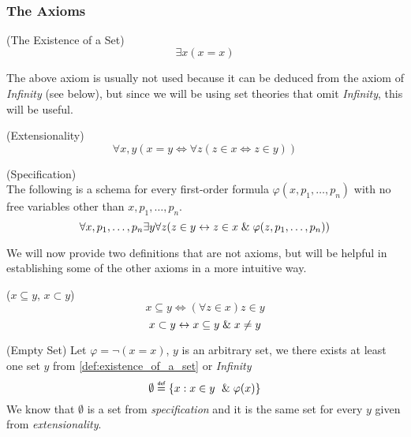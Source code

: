 \


\subsubsection{The Axioms}

\begin{definition}{(The Existence of a Set)}\label{def:existence_of_a_set}
\begin{equation}
\exists x (x = x)
\end{equation}
\end{definition}
The above axiom is usually not used because it can be deduced from the axiom of \emph{Infinity} (see below), but since we will be using set theories that omit \emph{Infinity}, this will be useful.

\begin{definition}{(Extensionality)}\label{def:extensionality}
\begin{equation}
\forall x, y (x = y \iff \forall z (z \in x \iff z \in y)) %
\end{equation}
\end{definition}

\begin{definition}{(Specification)}\label{def:specification}\\
The following is a schema for every first-order formula $\varphi(x, p_1, \ldots, p_n)$ with no free variables other than $x, p_1, \ldots, p_n$.
\begin{equation}
\forall x, p_1, \ldots, p_n \exists y \forall z ( z \in y \iff z \in x \et \varphi(z, p_1, \ldots, p_n)) %
\end{equation}
\end{definition}

We will now provide two definitions that are not axioms, but will be helpful in establishing some of the other axioms in a more intuitive way.
\begin{definition}{($x \subseteq y$, $x \subset y$)}\label{def:subset}
\begin{equation}
x \subseteq y \iff (\forall z \in x) z \in y
\end{equation}
\begin{equation}
x \subset y \leftrightarrow x \subseteq y \mathrel{\&} x \neq y
\end{equation}
\end{definition}

\begin{definition}{(Empty Set)}\label{def:emptyset}
Let $\varphi = \neg(x = x)$, $y$ is an arbitrary set, we there exists at least one set $y$ from \ref{def:existence_of_a_set} or \emph{Infinity}
\begin{equation}
\emptyset \defeq \{x : x \in y\ \et \varphi(x)\}
\end{equation}
We know that $\emptyset$ is a set from \emph{specification} and it is the same set for every $y$ given from \emph{extensionality}.
\end{definition}

